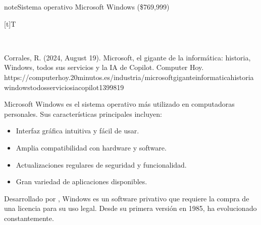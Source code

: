 \documentclass[letterpaper,10pt,spanish]{sphinxmanual}
\let\sphinxpxdimen\pdfpxdimen\else\newdimen\sphinxpxdimen
\begin{document}
\begin{sphinxadmonition}{note}{Sistema operativo Microsoft Windows (\$769,999)}


\begin{savenotes}\sphinxattablestart
\sphinxthistablewithglobalstyle
\centering
\begin{tabulary}{\linewidth}[t]{T}
\sphinxtoprule
\sphinxtableatstartofbodyhook

\begin{sphinxfigure-in-table}
\centering
\capstart
\noindent\sphinxincludegraphics[width=300\sphinxpxdimen]{{image093}.png}
\label{\detokenize{1_guias/10ofimatica/G1012:id49}}\end{sphinxfigure-in-table}\relax
\\
\sphinxbottomrule
\end{tabulary}
\sphinxtableafterendhook\par
\sphinxattableend\end{savenotes}

\sphinxAtStartPar
%
\begin{footnote}[11]\sphinxAtStartFootnote
Corrales, R. (2024, August 19). Microsoft, el gigante de la informática: historia, Windows, todos sus servicios y la IA de Copilot. Computer Hoy. https://computerhoy.20minutos.es/industria/microsoft\sphinxhyphen{}gigante\sphinxhyphen{}informatica\sphinxhyphen{}historia\sphinxhyphen{}windows\sphinxhyphen{}todos\sphinxhyphen{}servicios\sphinxhyphen{}ia\sphinxhyphen{}copilot\sphinxhyphen{}1399819
%
\end{footnote} Microsoft Windows es el sistema operativo más utilizado en computadoras personales. Sus características principales incluyen:
\begin{itemize}
\item {} 
\sphinxAtStartPar
Interfaz gráfica intuitiva y fácil de usar.

\item {} 
\sphinxAtStartPar
Amplia compatibilidad con hardware y software.

\item {} 
\sphinxAtStartPar
Actualizaciones regulares de seguridad y funcionalidad.

\item {} 
\sphinxAtStartPar
Gran variedad de aplicaciones disponibles.

\end{itemize}

\sphinxAtStartPar
Desarrollado por , Windows es un software privativo que requiere la compra de una licencia para su uso legal. Desde su primera versión en 1985, ha evolucionado constantemente.
\end{sphinxadmonition}
\end{document}
